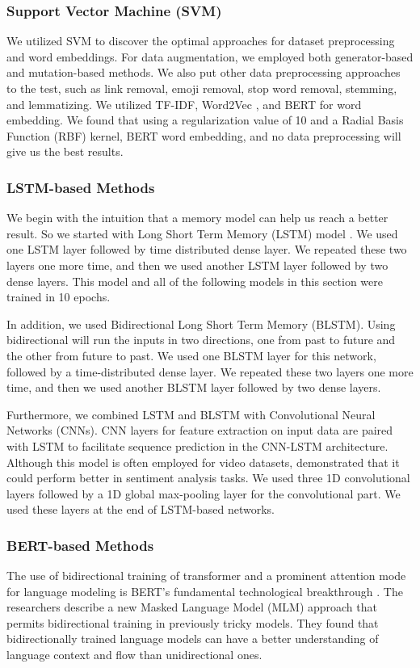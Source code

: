 \documentclass[11pt]{article}
\begin{document}
\subsubsection{Support Vector Machine (SVM)}
We utilized SVM to discover the optimal approaches for dataset preprocessing and word embeddings. For data augmentation, we employed both generator-based and mutation-based methods. We also put other data preprocessing approaches to the test, such as link removal, emoji removal, stop word removal, stemming, and lemmatizing. We utilized TF-IDF, Word2Vec \cite{mikolov2013efficient}, and BERT \cite{devlin2018bert} for word embedding. We found that using a regularization value of 10 and a Radial Basis Function (RBF) kernel, BERT word embedding, and no data preprocessing will give us the best results.

\subsubsection{LSTM-based Methods}
We begin with the intuition that a memory model can help us reach a better result. So we started with Long Short Term Memory (LSTM) model \cite{hochreiter1997long}. We used one LSTM layer followed by time distributed dense layer. We repeated these two layers one more time, and then we used another LSTM layer followed by two dense layers. This model and all of the following models in this section were trained in 10 epochs. 

In addition, we used Bidirectional Long Short Term Memory (BLSTM). Using bidirectional will run the inputs in two directions, one from past to future and the other from future to past. We used one BLSTM layer for this network, followed by a time-distributed dense layer. We repeated these two layers one more time, and then we used another BLSTM layer followed by two dense layers.

Furthermore, we combined LSTM and BLSTM with Convolutional Neural Networks (CNNs). CNN layers for feature extraction on input data are paired with LSTM to facilitate sequence prediction in the CNN-LSTM architecture.
Although this model is often employed for video datasets, \cite{rehman2019hybrid}  demonstrated that it could perform better in sentiment analysis tasks.
We used three 1D convolutional layers followed by a 1D global max-pooling layer for the convolutional part. We used these layers at the end of LSTM-based networks.

\subsubsection{BERT-based Methods}
The use of bidirectional training of transformer and a prominent attention mode for language modeling is BERT's fundamental technological breakthrough \cite{devlin2018bert}. The researchers describe a new Masked Language Model (MLM) approach that permits bidirectional training in previously tricky models.
They found that bidirectionally trained language models can have a better understanding of language context and flow than unidirectional ones. 
\end{document}
